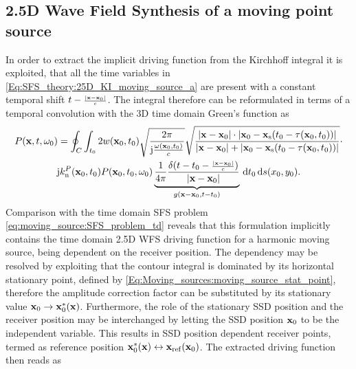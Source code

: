 \subsection{2.5D Wave Field Synthesis of a moving point source}

In order to extract the implicit driving function from the Kirchhoff integral it is exploited, that all the time variables in \eqref{Eq:SFS_theory:25D_KI_moving_source_a} are present with a constant temporal shift $t-{\scriptstyle \frac{|\mathbf{x}-\mathbf{x}_0|}{c} }$.
The integral therefore can be reformulated in terms of a temporal convolution with the 3D time domain Green's function as
\begin{multline}
P(\vx,t,\omega_0) =
\oint_{C}  \int_{t_0} 2 w(\vxo,t_0 ) 
\sqrt{\frac{2\pi}{\ti\frac{\omega(\vxo,t_0)}{c}}}
\sqrt{\frac{|\vx-\vxo|\cdot|\vxo - \vxs(t_0-\tau(\vxo,t_0))|}{|\vx-\vxo|+|\vxo - \vxs(t_0-\tau(\vxo,t_0))|}} \cdot \\ %
 \ti k_{\mathrm{n}}^P(\vxo,t_0) P(\vxo,t_0,\omega_0)
\underbrace{\frac{1}{4\pi} \frac{ \delta(t-t_0- \Tret) }{|\vx-\vxo|}}_{g(\vx-\vxo,t-t_0)}
\, \td t_0 \, \td s(x_0, y_0).
\label{Eq:SFS_theory:25D_KI_moving_source_2}
\end{multline}
Comparison with the time domain SFS problem \eqref{eq:moving_source:SFS_problem_td} reveals that this formulation implicitly contains the time domain 2.5D WFS driving function for a harmonic moving source, being dependent on the receiver position.
The dependency may be resolved by exploiting that the contour integral is dominated by its horizontal stationary point, defined by \eqref{Eq:Moving_sources:moving_source_stat_point}, therefore the amplitude correction factor can be substituted by its stationary value $\mathbf{x}_0 \rightarrow \mathbf{x}_0^*(\mathbf{x})$.
Furthermore, the role of the stationary SSD position and the receiver position may be interchanged by letting the SSD position $\mathbf{x}_0$ to be the independent variable.
This results in SSD position dependent receiver points, termed as reference position $\mathbf{x}_0^*(\mathbf{x}) \leftrightarrow \mathbf{x}_{\mathrm{ref}}(\mathbf{x}_0)$.
The extracted driving function then reads as
